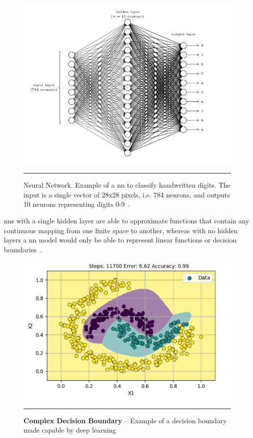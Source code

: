 \begin{figure}[H]
\includegraphics[width=1\textwidth]{media/literature/handwrittenDigitNN.png}
    \rule{35em}{0.5pt}
\caption[Example of a neural network]{Neural Network. Example of a \Gls{nn} to
classify handwritten digits. The input is a single vector of 28x28 pixels, i.e. 784 neurons, and outputs
10 neurons representing digits 0-9~\citep{Nielsen2015}.}\label{fig:nn}
\end{figure}

\glspl{nn} with a single hidden layer are able to approximate functions that contain any 
continuous mapping from one finite space to another, whereas with no hidden layers a \gls{nn}
model would only be able to represent linear functions or decision boundaries~\citep{hornik1991}.

\begin{figure}[H]
\includegraphics[width=1\textwidth]{media/literature/deep-boundary.png}
    \rule{35em}{0.5pt}
    \caption[Complex decision boundary from deep neural network]{\textbf{Complex Decision Boundary} -- Example of a decision boundary made capable by deep learning~\citep{sapkota2020}}\label{fig:dnn-decision}
\end{figure}

